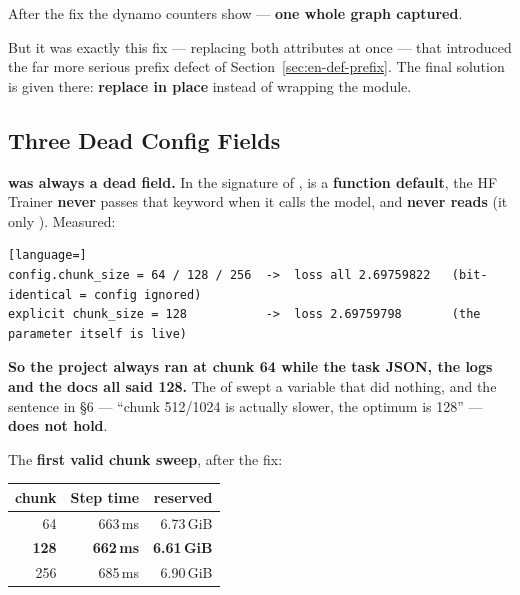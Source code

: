 After the fix the dynamo counters show
 --- \textbf{one whole graph
captured}.

\begin{notebox}
But it was exactly this fix --- replacing both attributes at once --- that introduced the far
more serious prefix defect of Section~\ref{sec:en-def-prefix}. The final solution is given
there: \textbf{replace  in place} instead of wrapping the module.
\end{notebox}

\subsection{Three Dead Config Fields}
\label{sec:en-eng-dead}

\textbf{ was always a dead field.} In the signature of
,  is a \textbf{function default}, the
HF Trainer \textbf{never} passes that keyword when it calls the model, and 
\textbf{never reads}  (it only
). Measured:

\begin{lstlisting}[language=]
config.chunk_size = 64 / 128 / 256  ->  loss all 2.69759822   (bit-identical = config ignored)
explicit chunk_size = 128           ->  loss 2.69759798       (the parameter itself is live)
\end{lstlisting}

\textbf{So the project always ran at chunk 64 while the task JSON, the logs and the docs all
said 128.} The  of  swept a
variable that did nothing, and the sentence in  \S6 --- ``chunk 512/1024 is
actually slower, the optimum is 128'' --- \textbf{does not hold}.

The \textbf{first valid chunk sweep}, after the fix:

\begin{center}\small
\begin{tabular}{@{}rrr@{}}
\toprule
\textbf{chunk} & \textbf{Step time} & \textbf{reserved} \\
\midrule
64 & 663\,ms & 6.73\,GiB \\
\textbf{128} & \textbf{662\,ms} & \textbf{6.61\,GiB} \\
256 & 685\,ms & 6.90\,GiB \\
\bottomrule
\end{tabular}
\end{center}

